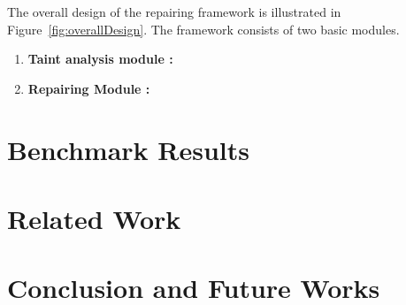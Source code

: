 \documentclass{sigplanconf}
\begin{document}
The overall design of the repairing framework is illustrated in
Figure~\ref{fig:overallDesign}. The framework consists of two basic modules.

\begin{enumerate}
  \item \textbf{Taint analysis module :}
  \item \textbf{Repairing Module : }
\end{enumerate}

\section{Benchmark Results}
\label{sec:bench}

\section{Related Work}
\label{sec:rel}

\section{Conclusion and Future Works}
\label{sec:conc}


\acks










\end{document}
